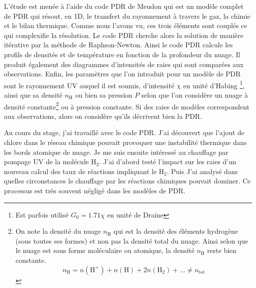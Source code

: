 \documentclass[11pt,a4paper]{article}
\begin{document}
\begin{spacing}{0.98}
L'étude est menée à l'aide du code PDR de Meudon \cite{LePetit2006} qui est un modèle complet de PDR qui résout, en 1D, le transfert du rayonnement à travers le gaz, la chimie et le bilan thermique. 
Comme nous l'avons vu, ces trois éléments sont couplés ce qui complexifie la résolution. Le code PDR cherche alors la solution de manière itérative par la méthode de Raphson-Newton. Ainsi le code PDR calcule les profils de densités et de température en fonction de la profondeur du nuage. Il produit également des diagrammes d'intensités de raies qui sont comparées aux observations.  Enfin, les paramètres que l'on introduit pour un modèle de PDR sont le rayonnement UV auquel il est soumis, d'intensité $\chi$ en unité d'Habing \footnote{Est parfois utilisé $G_0 = 1.71\chi$ en unité de Draine}, ainsi que sa densité $n_\mathrm{H}$ ou bien sa pression $P$ selon que l'on considère un nuage à densité constante\footnote{On note la densité du nuage $n_\mathrm{H}$ qui est la densité des éléments hydrogène (sous toutes ses formes) et non pas la densité total du nuage. Ainsi selon que le nuage est sous forme moléculaire ou atomique, la densité $n_\mathrm{H}$ reste bien constante.
\begin{equation*}
n_\mathrm{H} =  n(\mathrm{H}^+) + n(\mathrm{H}) + 2n(\mathrm{H}_2) +  ... \neq n_\mathrm{tot}
\end{equation*}
} ou à pression constante. Si des raies de modèles correspondent aux observations, alors on considère qu'ils décrivent bien la PDR.  \newline 

Au cours du stage, j'ai travaillé avec le code PDR. J'ai découvert que l'ajout de chlore dans le réseau chimique pouvait provoquer une instabilité thermique dans les bords atomique de nuage. Je me suis ensuite intéressé au chauffage par pompage UV de la molécule $\mathrm{H}_2$. J'ai d'abord testé l'impact sur les raies d'un nouveau calcul des taux de réactions impliquant le $\mathrm{H}_2$. Puis J'ai analysé dans quelles circonstances le chauffage par les réactions chimiques pouvait dominer. Ce processus est très souvent négligé dans les modèles de PDR. 




\end{spacing}
\end{document}
